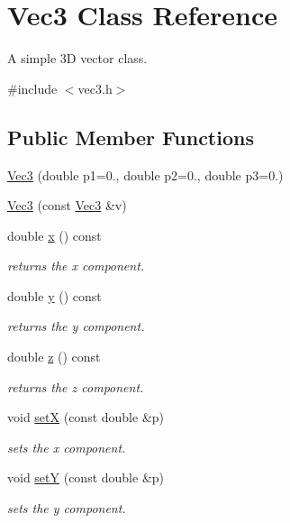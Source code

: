 \hypertarget{classVec3}{}\section{Vec3 Class Reference}
\label{classVec3}


A simple 3D vector class.  




{\ttfamily \#include $<$vec3.\+h$>$}

\subsection*{Public Member Functions}
\begin{DoxyCompactItemize}
\item 
\mbox{\hyperlink{classVec3_a592864fbd499222e456c7615a89cc3b4}{Vec3}} (double p1=0., double p2=0., double p3=0.)
\item 
\mbox{\hyperlink{classVec3_a2ca080e91b77109c23ba5c387a2c1ddb}{Vec3}} (const \mbox{\hyperlink{classVec3}{Vec3}} \&v)
\item 
double \mbox{\hyperlink{classVec3_aa0c360c4d0f99d61709283abbd6deaf9}{x}} () const
\begin{DoxyCompactList}\small\item\em returns the x component. \end{DoxyCompactList}\item 
double \mbox{\hyperlink{classVec3_a83d4776aef2cb68f2382e2f7f60fb03d}{y}} () const
\begin{DoxyCompactList}\small\item\em returns the y component. \end{DoxyCompactList}\item 
double \mbox{\hyperlink{classVec3_a6e36d3b30e7d9727a57785d3c2b88471}{z}} () const
\begin{DoxyCompactList}\small\item\em returns the z component. \end{DoxyCompactList}\item 
void \mbox{\hyperlink{classVec3_a83a4fdb7ce021c5f28a677b05bf21d69}{setX}} (const double \&p)
\begin{DoxyCompactList}\small\item\em sets the x component. \end{DoxyCompactList}\item 
void \mbox{\hyperlink{classVec3_a51325493ea6f91ef0fc5234d314dc9ee}{setY}} (const double \&p)
\begin{DoxyCompactList}\small\item\em sets the y component. \end{DoxyCompactList}\item 

\end{DoxyCompactItemize}
